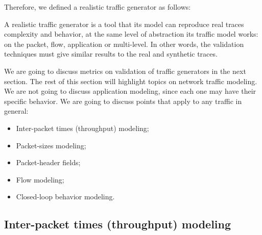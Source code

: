 Therefore, we defined a realistic traffic generator as follows:

\vspace{5mm}
\begin{tcolorbox}[colback=blue!5,colframe=blue!40!black,title=Realistic Traffic Generator]
A realistic traffic generator is a tool that its model can reproduce real traces complexity and behavior, at the same level of abstraction its traffic model works: on the packet, flow, application or multi-level. In other words, the validation techniques must give similar results to the real and synthetic traces. 
\end{tcolorbox}
\vspace{5mm}

We are going to discuss metrics on validation of traffic generators in the next section. The rest of this section will highlight topics on network traffic modeling. We are not going to discuss application modeling, since each one may have their specific behavior. We are going to discuss points that apply to any traffic in general:

\begin{itemize}
\item Inter-packet times (throughput) modeling;
\item Packet-sizes modeling;
\item Packet-header fields;
\item Flow modeling;
\item Closed-loop behavior modeling.
\end{itemize}

\subsection{Inter-packet times (throughput) modeling}


